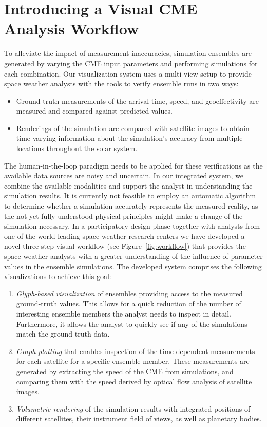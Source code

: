 \documentclass[journal]{vgtc}                %
\begin{document}
\section{Introducing a Visual CME Analysis Workflow}
To alleviate the impact of measurement inaccuracies, simulation ensembles are generated by varying the CME input parameters and performing simulations for each combination. Our visualization system uses a multi-view setup to provide space weather analysts with the tools to verify ensemble runs in two ways:
\begin{itemize}
\item{Ground-truth measurements of the arrival time, speed, and geoeffectivity are measured and compared against predicted values.} 
\item{Renderings of the simulation are compared with satellite images to obtain time-varying information about the simulation's accuracy from multiple locations throughout the solar system.} 
\end{itemize}

The human-in-the-loop paradigm needs to be applied for these verifications as the available data sources are noisy and uncertain. In our integrated system, we combine the available modalities and support the analyst in understanding the simulation results. It is currently not feasible to employ an automatic algorithm to determine whether a simulation accurately represents the measured reality, as the not yet fully understood physical principles might make a change of the simulation necessary. In a participatory design phase together with analysts from one of the world-leading space weather research centers we have developed a novel three step visual workflow (see Figure~\ref{fig:workflow}) that provides the space weather analysts with a greater understanding of the influence of parameter values in the ensemble simulations. The developed system comprises the following visualizations to achieve this goal:

\begin{enumerate}
\item{\emph{Glyph-based visualization} of ensembles providing access to the measured ground-truth values. This allows for a quick reduction of the number of interesting ensemble members the analyst needs to inspect in detail. Furthermore, it allows the analyst to quickly see if any of the simulations match the ground-truth data.}

\item{\emph{Graph plotting} that enables inspection of the time-dependent measurements for each satellite for a specific ensemble member. These measurements are generated by extracting the speed of the CME from simulations, and comparing them with the speed derived by optical flow analysis of satellite images.}

\item{\emph{Volumetric rendering} of the simulation results with integrated positions of different satellites, their instrument field of views, as well as planetary bodies.}
\end{enumerate} 
\end{document}
